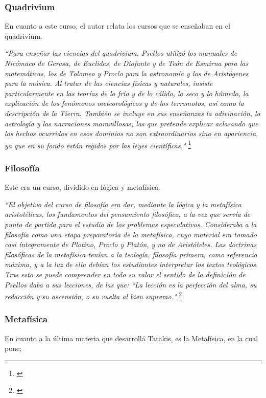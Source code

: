 \subsubsection{Quadrivium}
En cuanto a este curso, el autor relata los cursos 
que se enseñaban en el quadrivium.

\textit{“Para enseñar las ciencias del quadrivium, Psellos utilizó los 
manuales de Nicómaco de Gerasa, de Euclides, de Diofante y de 
Teón de Esmirna para las matemáticas, los de Tolomeo y Proclo para la 
astronomía y los de Aristógenes para la música. 
Al tratar de las ciencias físicas y naturales, insiste particularmente 
en las teorías de lo frío y de lo cálido, lo seco y lo húmedo, 
la explicación de los fenómenos meteorológicos y de los terremotos, 
así como la descripción de la Tierra. 
También se incluye en sus enseñanzas la adivinación, 
la astrología y las narraciones maravillosas, 
las que pretende explicar aclarando que los hechos ocurridos en esos 
dominios no son extraordinarios sino en apariencia, 
ya que en su fondo están regidos por las leyes científicas."}
\footnote{\cite[p.~163]{filosofia}}

\subsubsection{Filosofía}
Este era un curso, dividido en lógica y metafísica.

\textit{“El objetivo del curso de filosofía era dar, mediante la lógica y 
la metafísica aristotélicas, los fundamentos del pensamiento 
filosófico, a la vez que servía de punto de partida para el 
estudio de los problemas especulativos. Consideraba a la filosofía 
como una etapa preparatoria de la metafísica, cuyo material era tomado 
casi íntegramente de Plotino, Proclo y Platón, y no de Aristóteles. 
Las doctrinas filosóficas de la metafísica tenían a la teología, 
filosofía primera, como referencia máxima, y a la luz de ella debían 
los estudiantes interpretar los textos teológicos. 
Tras esto se puede comprender en todo su valor el sentido de la 
definición de Psellos daba a sus lecciones, de las que: 
“La lección es la perfección del alma, su redacción y su ascensión, 
o su vuelta al bien supremo."}
\footnote{\cite[pp.~164--165]{filosofia}}

\subsubsection{Metafísica}
En cuanto a la última materia que desarrollá Tatakis, 
es la Metafísica, en la cual pone;

